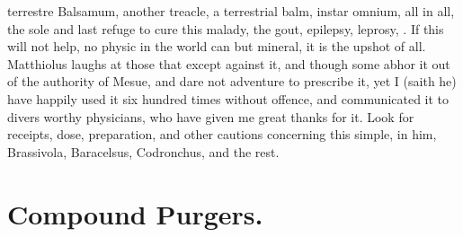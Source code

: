 {terrestre Balsamum, another treacle, a terrestrial balm, instar omnium,
all in all, the sole and last refuge to cure this malady, the
gout, epilepsy, leprosy, \etc{}. If this will not help, no physic in the
world can but mineral, it is the upshot of all. Matthiolus laughs at
those that except against it, and though some abhor it out of the
authority of Mesue, and dare not adventure to prescribe it, yet I
(saith he) have happily used it six hundred times without offence, and
communicated it to divers worthy physicians, who have given me great
thanks for it. Look for receipts, dose, preparation, and other cautions
concerning this simple, in him, Brassivola, Baracelsus, Codronchus, and
the rest.

\section{Compound Purgers.}

}
